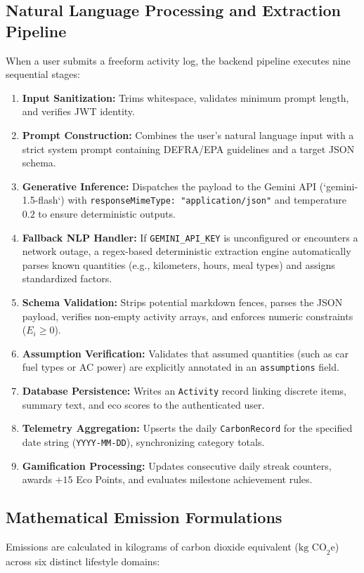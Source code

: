 \documentclass[12pt,a4paper]{article}
\begin{document}
\subsection{Natural Language Processing and Extraction Pipeline}
When a user submits a freeform activity log, the backend pipeline executes nine sequential stages:
\begin{enumerate}
    \item \textbf{Input Sanitization:} Trims whitespace, validates minimum prompt length, and verifies JWT identity.
    \item \textbf{Prompt Construction:} Combines the user's natural language input with a strict system prompt containing DEFRA/EPA guidelines and a target JSON schema.
    \item \textbf{Generative Inference:} Dispatches the payload to the Gemini API (`gemini-1.5-flash`) with \texttt{responseMimeType: "application/json"} and temperature $0.2$ to ensure deterministic outputs.
    \item \textbf{Fallback NLP Handler:} If \texttt{GEMINI\_API\_KEY} is unconfigured or encounters a network outage, a regex-based deterministic extraction engine automatically parses known quantities (e.g., kilometers, hours, meal types) and assigns standardized factors.
    \item \textbf{Schema Validation:} Strips potential markdown fences, parses the JSON payload, verifies non-empty activity arrays, and enforces numeric constraints ($E_i \ge 0$).
    \item \textbf{Assumption Verification:} Validates that assumed quantities (such as car fuel types or AC power) are explicitly annotated in an \texttt{assumptions} field.
    \item \textbf{Database Persistence:} Writes an \texttt{Activity} record linking discrete items, summary text, and eco scores to the authenticated user.
    \item \textbf{Telemetry Aggregation:} Upserts the daily \texttt{CarbonRecord} for the specified date string (\texttt{YYYY-MM-DD}), synchronizing category totals.
    \item \textbf{Gamification Processing:} Updates consecutive daily streak counters, awards $+15$ Eco Points, and evaluates milestone achievement rules.
\end{enumerate}

\subsection{Mathematical Emission Formulations}
Emissions are calculated in kilograms of carbon dioxide equivalent ($\text{kg CO}_2\text{e}$) across six distinct lifestyle domains:
\end{document}
